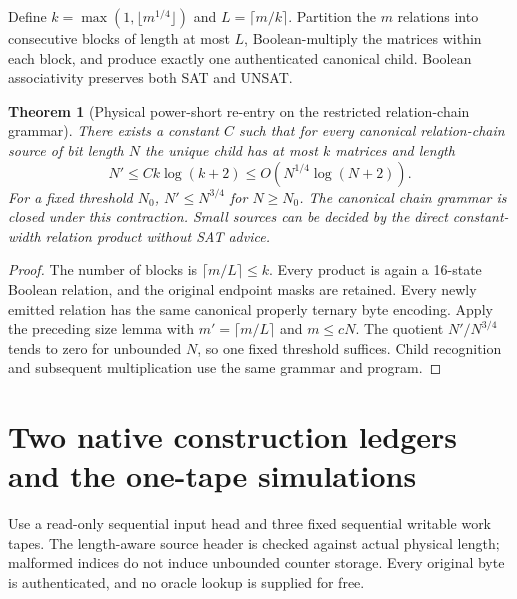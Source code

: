 \documentclass[11pt]{article}
\newtheorem{theorem}{Theorem}
\begin{document}
Define $k=\max(1,\lfloor m^{1/4}\rfloor)$ and $L=\lceil m/k\rceil$. Partition the $m$ relations into consecutive blocks of length at most $L$, Boolean-multiply the matrices within each block, and produce exactly one authenticated canonical child. Boolean associativity preserves both SAT and UNSAT.
\begin{theorem}[Physical power-short re-entry on the restricted relation-chain grammar]
There exists a constant $C$ such that for every canonical relation-chain source of bit length $N$ the unique child has at most $k$ matrices and length
\[
 N'\le C k\log(k+2)\le O(N^{1/4}\log(N+2)).
\]
For a fixed threshold $N_0$, $N'\le N^{3/4}$ for $N\ge N_0$. The canonical chain grammar is closed under this contraction. Small sources can be decided by the direct constant-width relation product without SAT advice.
\end{theorem}
\begin{proof}
The number of blocks is $\lceil m/L\rceil\le k$. Every product is again a 16-state Boolean relation, and the original endpoint masks are retained. Every newly emitted relation has the same canonical properly ternary byte encoding. Apply the preceding size lemma with $m'=\lceil m/L\rceil$ and $m\le cN$. The quotient $N'/N^{3/4}$ tends to zero for unbounded $N$, so one fixed threshold suffices. Child recognition and subsequent multiplication use the same grammar and program.
\end{proof}

\section{Two native construction ledgers and the one-tape simulations}
Use a read-only sequential input head and three fixed sequential writable work tapes. The length-aware source header is checked against actual physical length; malformed indices do not induce unbounded counter storage. Every original byte is authenticated, and no oracle lookup is supplied for free.
\end{document}
